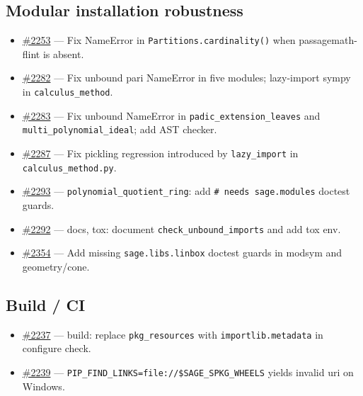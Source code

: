 \documentclass[10pt]{article}
\begin{document}
\subsection*{Modular installation robustness}
\begin{itemize}
  \item \href{https://github.com/passagemath/passagemath/pull/2253}{\#2253} --- Fix NameError in \texttt{Partitions.cardinality()} when passagemath-flint is absent.
  \item \href{https://github.com/passagemath/passagemath/pull/2282}{\#2282} --- Fix unbound pari NameError in five modules; lazy-import sympy in \texttt{calculus\_method}.
  \item \href{https://github.com/passagemath/passagemath/pull/2283}{\#2283} --- Fix unbound NameError in \texttt{padic\_extension\_leaves} and \texttt{multi\_polynomial\_ideal}; add AST checker.
  \item \href{https://github.com/passagemath/passagemath/pull/2287}{\#2287} --- Fix pickling regression introduced by \texttt{lazy\_import} in \texttt{calculus\_method.py}.
  \item \href{https://github.com/passagemath/passagemath/pull/2293}{\#2293} --- \texttt{polynomial\_quotient\_ring}: add \texttt{\# needs sage.modules} doctest guards.
  \item \href{https://github.com/passagemath/passagemath/pull/2292}{\#2292} --- docs, tox: document \texttt{check\_unbound\_imports} and add tox env.
  \item \href{https://github.com/passagemath/passagemath/pull/2354}{\#2354} --- Add missing \texttt{sage.libs.linbox} doctest guards in modsym and geometry/cone.
\end{itemize}

\subsection*{Build / CI}
\begin{itemize}
  \item \href{https://github.com/passagemath/passagemath/pull/2237}{\#2237} --- build: replace \texttt{pkg\_resources} with \texttt{importlib.metadata} in configure check.
  \item \href{https://github.com/passagemath/passagemath/issues/2239}{\#2239} --- \texttt{PIP\_FIND\_LINKS=file://\$SAGE\_SPKG\_WHEELS} yields invalid uri on Windows.
\end{itemize}
\end{document}
